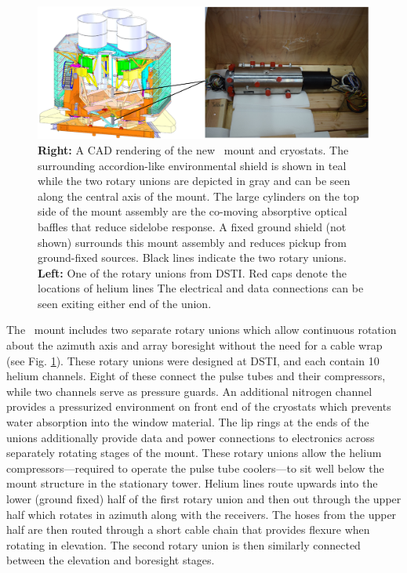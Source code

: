\documentclass[]{spie}
\begin{document}
\begin{figure} [hb]
	\begin{center}
		\includegraphics{mount.png}
	\end{center}
	\caption{\textbf{Right:} A CAD rendering of the new \biceparray\ mount and cryostats. The surrounding
	accordion-like environmental shield is shown in teal while the two rotary
	unions are depicted in gray and can be seen along the central axis of the
	mount. The large cylinders on the top side of the mount assembly are
	the co-moving absorptive optical baffles that reduce sidelobe response. A fixed
	ground shield (not shown) surrounds this mount assembly and reduces pickup from
	ground-fixed sources. Black lines indicate the two rotary unions.
	\textbf{Left:} One of the rotary unions from DSTI\cite{dsti}. Red caps denote the
	locations of helium lines The electrical and data connections
	can be seen exiting either end of the union.}
	\label{fig:bamount}
\end{figure}


The \biceparray\ mount includes two separate rotary unions which allow
continuous rotation about the azimuth axis and array boresight without the need for a
cable wrap (see Fig. \ref{fig:bamount}). These rotary unions were designed at DSTI\cite{dsti}, and each contain 10
helium channels. Eight of these connect the pulse tubes and their compressors,
while two channels serve as pressure guards. An additional nitrogen channel
provides a pressurized environment on front end of the cryostats which prevents water absorption into the window material.  The lip rings at the
ends of the unions additionally provide data and power connections to
electronics across separately rotating stages of the mount. These rotary unions
allow the helium compressors---required to operate the pulse tube coolers---to
sit well below the mount structure in the stationary tower. Helium lines route
upwards into the lower (ground fixed) half of the first rotary union and then
out through the upper half which rotates in azimuth along with the receivers.
The hoses from the upper half are then routed through a short cable chain that
provides flexure when rotating in elevation. The second rotary union is then
similarly connected between the elevation and boresight stages.
\end{document}
